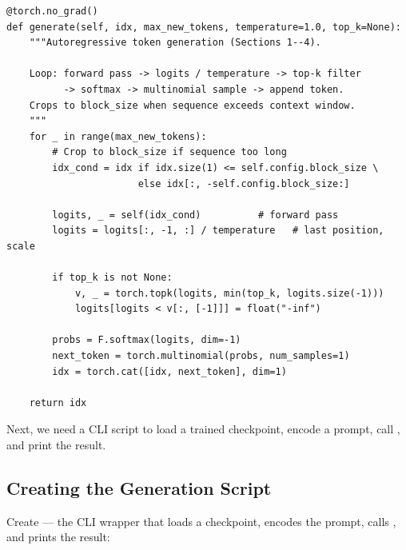 \begin{lstlisting}
@torch.no_grad()
def generate(self, idx, max_new_tokens, temperature=1.0, top_k=None):
    """Autoregressive token generation (Sections 1--4).

    Loop: forward pass -> logits / temperature -> top-k filter
          -> softmax -> multinomial sample -> append token.
    Crops to block_size when sequence exceeds context window.
    """
    for _ in range(max_new_tokens):
        # Crop to block_size if sequence too long
        idx_cond = idx if idx.size(1) <= self.config.block_size \
                       else idx[:, -self.config.block_size:]

        logits, _ = self(idx_cond)          # forward pass
        logits = logits[:, -1, :] / temperature   # last position, scale

        if top_k is not None:
            v, _ = torch.topk(logits, min(top_k, logits.size(-1)))
            logits[logits < v[:, [-1]]] = float("-inf")

        probs = F.softmax(logits, dim=-1)
        next_token = torch.multinomial(probs, num_samples=1)
        idx = torch.cat([idx, next_token], dim=1)

    return idx
\end{lstlisting}

Next, we need a CLI script to load a trained checkpoint, encode a prompt, call , and print the result.

\subsection{Creating the Generation Script}

Create  --- the CLI wrapper that loads a checkpoint, encodes the prompt, calls , and prints the result:

